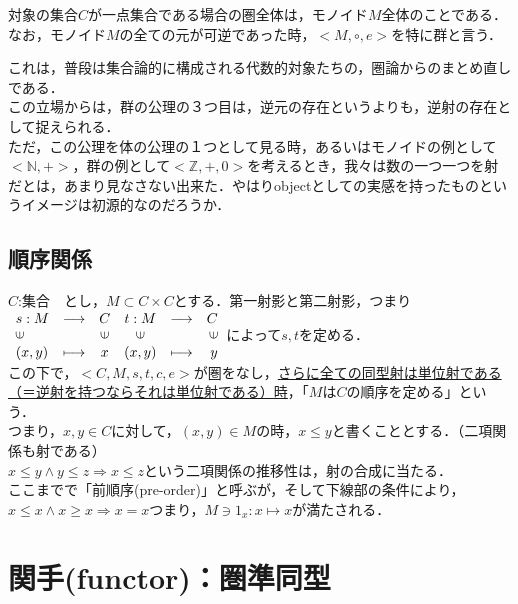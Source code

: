 \documentclass[uplatex, 12pt, a4paper, dvipdfmx]{jsarticle}
\begin{document}
\begin{screen}
    対象の集合$C$が一点集合である場合の圏全体は，モノイド$M$全体のことである．\\
    なお，モノイド$M$の全ての元が可逆であった時，$<M,\circ,e>$を特に群と言う．
\end{screen}

これは，普段は集合論的に構成される代数的対象たちの，圏論からのまとめ直しである．\\
この立場からは，群の公理の３つ目は，逆元の存在というよりも，逆射の存在として捉えられる．\\
ただ，この公理を体の公理の１つとして見る時，あるいはモノイドの例として$<\mathbb{N},+>$，群の例として$<\mathbb{Z},+,0>$を考えるとき，我々は数の一つ一つを射だとは，あまり見なさない出来た．やはりobjectとしての実感を持ったものというイメージは初源的なのだろうか．

\subsection{順序関係}

$C$:集合　とし，$M\subset C\times C$とする．第一射影と第二射影，つまり$\begin{array}{llccrr} s:M & \longrightarrow & C & t:M & \longrightarrow & C \\ \rotatebox{90}{$\in$} & & \rotatebox{90}{$\in$} & \rotatebox{90}{$\in$}& & \rotatebox{90}{$\in$}\\ (x,y) & \longmapsto & x & (x,y) & \longmapsto & y \end{array}$によって$s,t$を定める．\\
この下で，$<C,M,s,t,c,e>$が圏をなし，\underline{さらに全ての同型射は単位射である（＝逆射を持つならそれは単位射である）時}，「$M$は$C$の順序を定める」という．\\

つまり，$x,y\in C$に対して，$(x,y)\in M$の時，$x\le y$と書くこととする．（二項関係も射である）\\
$x\le y \wedge y\le z \Longrightarrow x\le z$という二項関係の推移性は，射の合成に当たる．\\
ここまでで「前順序(pre-order)」と呼ぶが，そして下線部の条件により，$x\le x \wedge x\ge x \Longrightarrow x=x$つまり，$M\ni 1_x:x\longmapsto x$が満たされる．

\clearpage
\section{関手(functor)：圏準同型}
\end{document}

